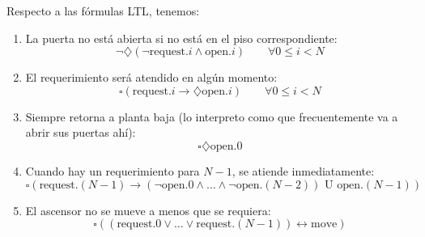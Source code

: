 \documentclass{article}
\begin{document}
Respecto a las fórmulas LTL, tenemos:
\begin{enumerate}
	\item La puerta no está abierta si no está en el piso correspondiente:
	      \begin{equation*}
		      \neg \diamondsuit (\neg \text{request}.i \land \text{open}.i) \qquad \forall 0 \leq i < N
	      \end{equation*}
	\item El requerimiento será atendido en algún momento:
	      \begin{equation*}
		      \square (\text{request}.i \to \diamondsuit \text{open}.i) \qquad \forall 0 \leq i < N
	      \end{equation*}
	\item Siempre retorna a planta baja (lo interpreto como que frecuentemente va a abrir sus puertas ahí):
	      \begin{equation*}
		      \square \diamondsuit \text{open}.0
	      \end{equation*}
	\item Cuando hay un requerimiento para $N-1$, se atiende inmediatamente:
	      \begin{equation*}
		      \square (\text{request}.(N-1) \to (\neg \text{open}.0 \land \dots \land \neg \text{open}.(N-2)) \text{ U } \text{open}.(N-1))
	      \end{equation*}
	\item El ascensor no se mueve a menos que se requiera:
	      \begin{equation*}
		      \square ((\text{request}.0 \lor \dots \lor \text{request}.(N-1)) \leftrightarrow \text{move})
	      \end{equation*}
\end{enumerate}
\end{document}
